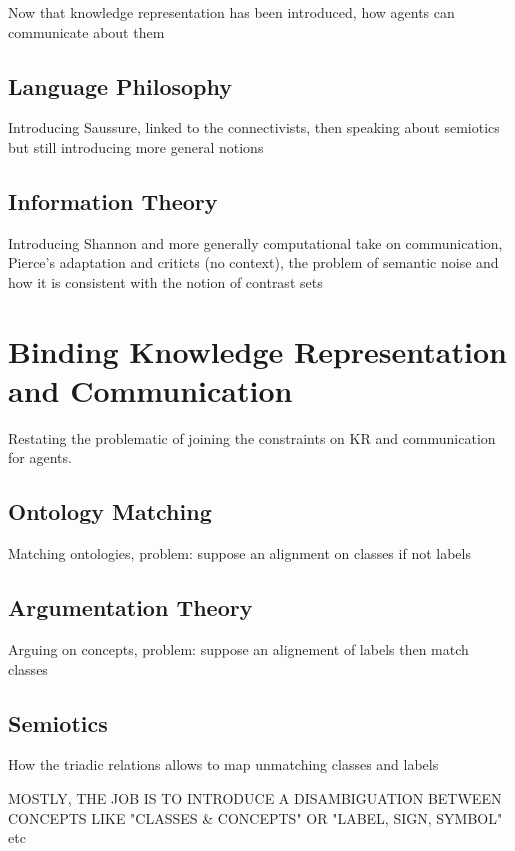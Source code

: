 Now that knowledge representation has been introduced, how agents can communicate about them

\subsection{Language Philosophy}

Introducing Saussure, linked to the connectivists, then speaking about semiotics but still introducing more general notions

\subsection{Information Theory}

Introducing Shannon and more generally computational take on communication, Pierce's adaptation and criticts (no context), the problem of semantic noise and how it is consistent with the notion of contrast sets

\section{Binding Knowledge Representation and Communication}

Restating the problematic of joining the constraints on KR and communication for agents.

\subsection{Ontology Matching}

Matching ontologies, problem: suppose an alignment on classes if not labels

\subsection{Argumentation Theory}

Arguing on concepts, problem: suppose an alignement of labels then match classes

\subsection{Semiotics}

How the triadic relations allows to map unmatching classes and labels


MOSTLY, THE JOB IS TO INTRODUCE A DISAMBIGUATION BETWEEN CONCEPTS LIKE "CLASSES \& CONCEPTS" OR "LABEL, SIGN, SYMBOL" etc

